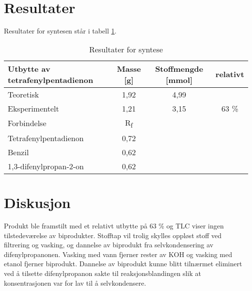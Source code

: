 \section{Resultater}

Resultater for syntesen står i tabell \ref{tab:res}.

\begin{table}[ht!]
    \centering
    \begin{tabular}{l c c c}
        \toprule
        Utbytte av tetrafenylpentadienon    & Masse [g] & Stoffmengde [mmol]    & relativt \\
        \midrule
        Teoretisk                           & 1,92      & 4,99 \\
        Eksperimentelt                      & 1,21      & 3,15                  & 63 \%    \\
        \midrule
        \midrule
        Forbindelse                         & R\textsubscript{f} \\
        \midrule
        Tetrafenylpentadienon               & 0,72 \\
        Benzil                              & 0,62 \\
        1,3-difenylpropan-2-on              & 0,62 \\
        \bottomrule
    \end{tabular}
    \caption{Resultater for syntese}
    \label{tab:res}
\end{table}

\newpage

\section{Diskusjon}

Produkt ble framstilt med et relativt utbytte på 63 \% og TLC viser ingen tilstedeværelse av biprodukter. Stofftap vil trolig skylles oppløst stoff ved filtrering og vasking, og dannelse av biprodukt fra selvkondensering av difenylpropanonen. Vasking med vann fjerner rester av KOH og vasking med etanol fjerner biprodukt. Dannelse av biprodukt kunne blitt tilnærmet eliminert ved å tilsette difenylpropanon sakte til reaksjonsblandingen slik at konsentrasjonen var for lav til å selvkondensere.